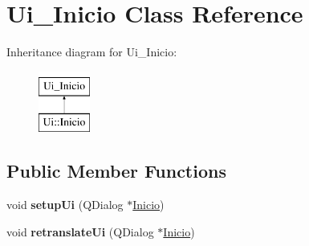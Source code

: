 \hypertarget{class_ui___inicio}{\section{Ui\-\_\-\-Inicio Class Reference}
\label{class_ui___inicio}
}
Inheritance diagram for Ui\-\_\-\-Inicio\-:\begin{figure}[H]
\begin{center}
\leavevmode
\includegraphics[height=2.000000cm]{class_ui___inicio}
\end{center}
\end{figure}
\subsection*{Public Member Functions}
\begin{DoxyCompactItemize}
\item 
\hypertarget{class_ui___inicio_a1688343a8860c7f725c89169263f0346}{void {\bfseries setup\-Ui} (Q\-Dialog $\ast$\hyperlink{class_inicio}{Inicio})}\label{class_ui___inicio_a1688343a8860c7f725c89169263f0346}

\item 
\hypertarget{class_ui___inicio_afb48f892cfc61a817b0363b692aef769}{void {\bfseries retranslate\-Ui} (Q\-Dialog $\ast$\hyperlink{class_inicio}{Inicio})}\label{class_ui___inicio_afb48f892cfc61a817b0363b692aef769}

\end{DoxyCompactItemize}
